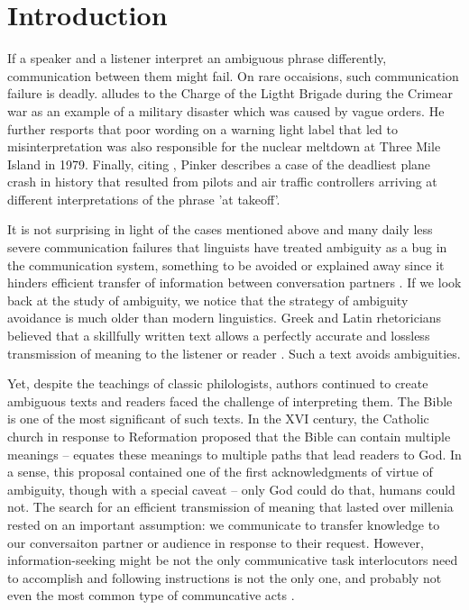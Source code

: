 \documentclass[10pt,a4paper]{article}
\begin{document}
\section{Introduction}

If a speaker and a listener interpret an ambiguous phrase differently, communication between them might fail. On rare occaisions, such communication failure is deadly.  alludes to the Charge of the Ligtht Brigade during the Crimear war as an example of a military disaster which was caused by vague orders. He further resports that poor wording on a warning light label that led to misinterpretation was also responsible for the nuclear meltdown at Three Mile Island in 1979. Finally, citing , Pinker describes a case of the deadliest plane crash in history that resulted from pilots and air traffic controllers arriving at different interpretations of the phrase 'at takeoff'.

It is not surprising in light of the cases mentioned above and many daily less severe communication failures that linguists have treated ambiguity as a bug in the communication system, something to be avoided or explained away since it hinders efficient transfer of information between conversation partners \cite{grice1975,chomsky2002minimalism}. 
If we look back at the study of ambiguity, we notice that the strategy of ambiguity avoidance is much older than modern linguistics. 
Greek and {L}atin rhetoricians believed that a skillfully written text allows a perfectly accurate and lossless transmission of meaning to the listener or reader \cite{ossarichardson2019}. Such a text avoids ambiguities.

Yet, despite the teachings of classic philologists, authors continued to  create ambiguous texts and  readers faced the challenge of interpreting them. The Bible is one of the most significant of such texts. In the XVI century, the Catholic church in response to Reformation proposed that the Bible can contain multiple meanings --  equates these meanings to multiple paths that lead readers to God. In a sense, this proposal contained one of the first acknowledgments of virtue of ambiguity, though with a  special caveat -- only God could do that, humans could not. The search for an efficient transmission of meaning that lasted over millenia rested on an important assumption: we communicate to transfer knowledge to our conversaiton partner or audience in response to their request. However, information-seeking might be not the only communicative task interlocutors need to accomplish \cite{markova1995preface} and following instructions is not the only one, and probably not even the most common type of communcative acts \cite{foppa1995mutual}. 
\end{document}

